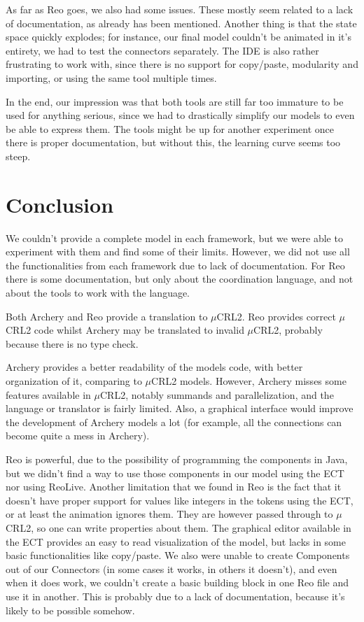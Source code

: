 \documentclass[a4paper]{article}
\newcommand{\ar}{Archery\xspace}
\newcommand{\re}{Reo\xspace}
\newcommand{\mcrl}{$\mu$CRL2\xspace}
\begin{document}
As far as \re goes, we also had some issues. These mostly seem related to a lack
of documentation, as already has been mentioned. Another thing is that the state
space quickly explodes; for instance, our final model couldn't be animated in
it's entirety, we had to test the connectors separately. The IDE is also rather
frustrating to work with, since there is no support for copy/paste, modularity
and importing, or using the same tool multiple times. 


In the end, our impression was that both tools are still far too immature to be
used for anything serious, since we had to drastically simplify our models to
even be able to express them. The tools might be up for another experiment once
there is proper documentation, but without this, the learning curve seems too
steep. 



%
%
\section{Conclusion}
We couldn't provide a complete model in each framework, but we were able to
experiment with them and find some of their limits. However, we did not use all the
functionalities from each framework due to lack of documentation. For \re there
is some documentation, but only about the coordination language, and not about
the tools to work with the language.

Both \ar and \re provide a translation to \mcrl. \re provides correct \mcrl
code whilst \ar may be translated to invalid \mcrl, probably because there is
no type check.

\ar provides a better readability of the models code, with better organization
of it, comparing to \mcrl models. However, \ar misses some features available
in \mcrl, notably summands and parallelization, and the language or translator is
fairly limited. Also, a graphical interface would improve the development of
\ar models a lot (for example, all the connections can become quite a mess in
\ar).


\re is powerful, due to the possibility of programming the components in Java,
but we didn't find a way to use those components in our model using the ECT nor
using ReoLive. Another limitation that we found in \re is the fact that it
doesn't have proper support for values like integers in the tokens using the
ECT, or at least the animation ignores them. They are however passed through to
\mcrl, so one can write properties about them. The graphical editor available in
the ECT provides an easy to read visualization of the model, but lacks in some
basic functionalities like copy/paste. We also were unable to create Components
out of our Connectors (in some cases it works, in others it doesn't), and even
when it does work, we couldn't create a basic building block in one \re file and
use it in another.  This is probably due to a lack of documentation, because
it's likely to be possible somehow.
\end{document}

